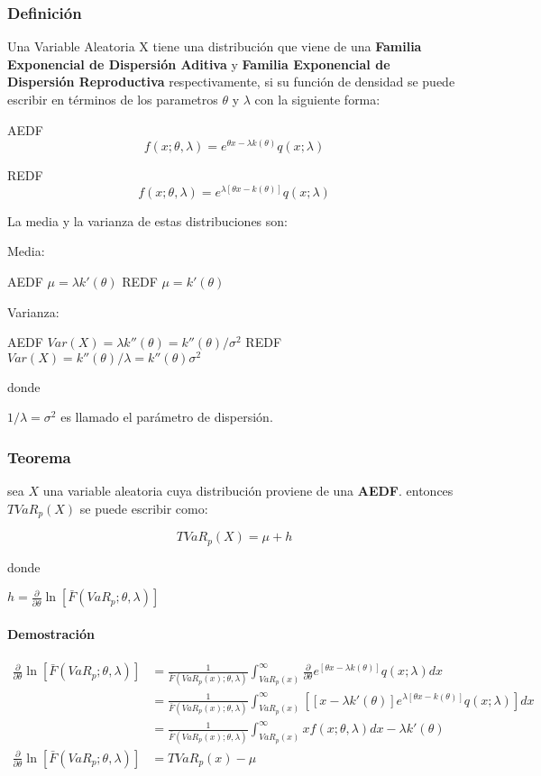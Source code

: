 \documentclass[10pt,]{article}
\begin{document}
\hypertarget{definicion}{%
\subsubsection{Definición}\label{definicion}}

Una Variable Aleatoria X tiene una distribución que viene de una
\textbf{Familia Exponencial de Dispersión Aditiva} y \textbf{Familia
Exponencial de Dispersión Reproductiva} respectivamente, si su función
de densidad se puede escribir en términos de los parametros \(\theta\) y
\(\lambda\) con la siguiente forma:

AEDF \[f(x;\theta, \lambda)=e^{\theta x-\lambda k(\theta)}q(x;\lambda)\]

REDF
\[f(x;\theta, \lambda)=e^{\lambda[\theta x- k(\theta)]}q(x;\lambda)\]

La media y la varianza de estas distribuciones son:

Media:

AEDF \(\mu = \lambda k'(\theta)\) REDF \(\mu=k'(\theta)\)

Varianza:

AEDF \(Var(X) = \lambda k''(\theta)=k''(\theta)/\sigma^2\) REDF
\(Var(X) = k''(\theta)/\lambda=k''(\theta)\sigma^2\)

donde

\(1/\lambda = \sigma^2\) es llamado el parámetro de dispersión.

\hypertarget{teorema-1}{%
\subsubsection{Teorema}\label{teorema-1}}

sea \(X\) una variable aleatoria cuya distribución proviene de una
\textbf{AEDF}. entonces \(TVaR_p(X)\) se puede escribir como:

\[TVaR_p(X)=\mu + h\]

donde

\(h=\frac{\partial}{\partial \theta}\ln[\bar{F}(VaR_p;\theta,\lambda)]\)

\hypertarget{demostracion-1}{%
\paragraph{Demostración}\label{demostracion-1}}

\[\begin{array}{rl}
\frac{\partial}{\partial \theta}\ln[\bar{F}(VaR_p;\theta,\lambda)] &\displaystyle= \frac{1}{\bar{F}(VaR_p(x);\theta,\lambda)} \int_{VaR_p(x)}^{\infty} \frac{\partial}{\partial \theta}e^{[\theta x - \lambda k(\theta)]}q(x;\lambda)dx\\
&\displaystyle= \frac{1}{\bar{F}(VaR_p(x);\theta,\lambda)} \int_{VaR_p(x)}^{\infty} \left[[x- \lambda k'(\theta)]e^{\lambda[\theta x - k(\theta)]}q(x;\lambda)\right]dx\\
&\displaystyle= \frac{1}{\bar{F}(VaR_p(x);\theta,\lambda)} \int_{VaR_p(x)}^{\infty} xf(x;\theta,\lambda)dx - \lambda k'(\theta)\\
\frac{\partial}{\partial \theta}\ln[\bar{F}(VaR_p;\theta,\lambda)] &\displaystyle= TVaR_p(x) - \mu
\end{array}\]
\end{document}
